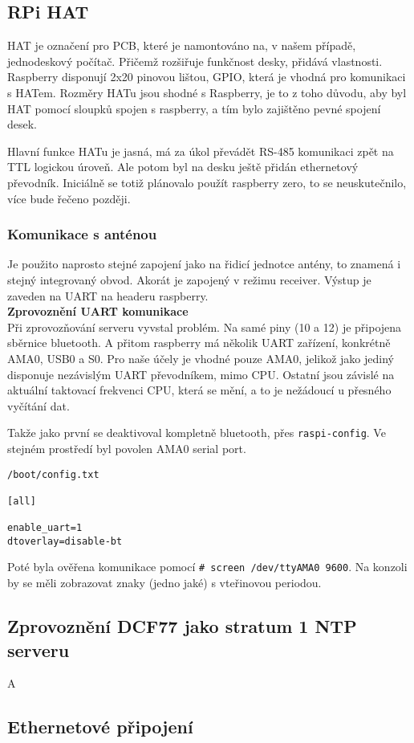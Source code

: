 \subsection{RPi HAT}
    HAT je označení pro PCB, které je namontováno na, v našem případě, jednodeskový
    počítač. Přičemž rozšiřuje funkčnost desky, přidává vlastnosti. Raspberry disponují
    2x20 pinovou lištou, GPIO, která je vhodná pro komunikaci s HATem. Rozměry HATu jsou
    shodné s Raspberry, je to z toho důvodu, aby byl HAT pomocí sloupků spojen s
    raspberry, a tím bylo zajištěno pevné spojení desek.

    Hlavní funkce HATu je jasná, má za úkol převádět RS-485 komunikaci zpět na TTL
    logickou úroveň. Ale potom byl na desku ještě přidán ethernetový převodník. Iniciálně
    se totiž plánovalo použít raspberry zero, to se neuskutečnilo, více bude řečeno
    později.
\subsubsection{Komunikace s anténou}

    Je použito naprosto stejné zapojení jako na řidicí jednotce antény, to znamená i
    stejný integrovaný obvod. Akorát je zapojený v režimu receiver. Výstup je zaveden na
    UART na headeru raspberry.
\\

\textbf{Zprovoznění UART komunikace}
\\

    Při zprovozňování serveru vyvstal problém. Na samé piny (10 a 12) je připojena
    sběrnice bluetooth. A přitom raspberry má několik UART zařízení, konkrétně AMA0,
    USB0 a S0. Pro naše účely je vhodné pouze AMA0, jelikož jako jediný disponuje
    nezávislým UART převodníkem, mimo CPU. Ostatní jsou závislé na aktuální taktovací
    frekvenci CPU, která se mění, a to je nežádoucí u přesného vyčítání dat.

    Takže jako první se deaktivoval kompletně bluetooth, přes \verb|raspi-config|. Ve
    stejném prostředí byl povolen AMA0 serial port.

    \vspace{1em}

\begin{lstlisting}
/boot/config.txt

[all]

enable_uart=1
dtoverlay=disable-bt
\end{lstlisting}

    \vspace{1em}

   Poté byla ověřena komunikace pomocí \verb|# screen /dev/ttyAMA0 9600|. Na konzoli by
   se měli zobrazovat znaky (jedno jaké) s vteřinovou periodou.

\subsection{Zprovoznění DCF77 jako stratum 1 NTP serveru}
    A

\subsection{Ethernetové připojení}


